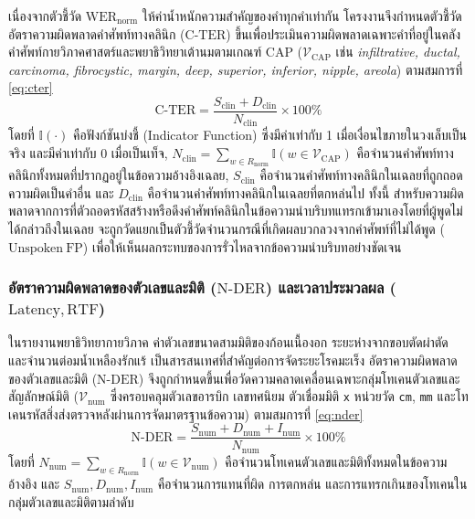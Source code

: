 เนื่องจากตัวชี้วัด $\mathrm{WER}_{\mathrm{norm}}$ ให้ค่าน้ำหนักความสำคัญของคำทุกคำเท่ากัน โครงงานจึงกำหนดตัวชี้วัดอัตราความผิดพลาดคำศัพท์ทางคลินิก ($\mathrm{C\text{-}TER}$) ขึ้นเพื่อประเมินความผิดพลาดเฉพาะคำที่อยู่ในคลังคำศัพท์กายวิภาคศาสตร์และพยาธิวิทยาเต้านมตามเกณฑ์ CAP ($\mathcal{V}_{\mathrm{CAP}}$ เช่น \textit{infiltrative, ductal, carcinoma, fibrocystic, margin, deep, superior, inferior, nipple, areola}) ตามสมการที่ \eqref{eq:cter}
\begin{equation}
\mathrm{C\text{-}TER} = \frac{S_{\mathrm{clin}} + D_{\mathrm{clin}}}{N_{\mathrm{clin}}} \times 100\%
\label{eq:cter}
\end{equation}
โดยที่ $\mathbb{I}(\cdot)$ คือฟังก์ชันบ่งชี้ (Indicator Function) ซึ่งมีค่าเท่ากับ 1 เมื่อเงื่อนไขภายในวงเล็บเป็นจริง และมีค่าเท่ากับ 0 เมื่อเป็นเท็จ, $N_{\mathrm{clin}} = \sum_{w \in R_{\mathrm{norm}}} \mathbb{I}(w \in \mathcal{V}_{\mathrm{CAP}})$ คือจำนวนคำศัพท์ทางคลินิกทั้งหมดที่ปรากฏอยู่ในข้อความอ้างอิงเฉลย, $S_{\mathrm{clin}}$ คือจำนวนคำศัพท์ทางคลินิกในเฉลยที่ถูกถอดความผิดเป็นคำอื่น และ $D_{\mathrm{clin}}$ คือจำนวนคำศัพท์ทางคลินิกในเฉลยที่ตกหล่นไป ทั้งนี้ สำหรับความผิดพลาดจากการที่ตัวถอดรหัสสร้างหรือดึงคำศัพท์คลินิกในข้อความนำบริบทแทรกเข้ามาเองโดยที่ผู้พูดไม่ได้กล่าวถึงในเฉลย จะถูกวัดแยกเป็นตัวชี้วัดจำนวนกรณีที่เกิดผลบวกลวงจากคำศัพท์ที่ไม่ได้พูด ($\mathrm{Unspoken\ FP}$) เพื่อให้เห็นผลกระทบของการรั่วไหลจากข้อความนำบริบทอย่างชัดเจน

\subsubsection{อัตราความผิดพลาดของตัวเลขและมิติ ($\mathrm{N\text{-}DER}$) และเวลาประมวลผล ($\mathrm{Latency}, \mathrm{RTF}$)}

ในรายงานพยาธิวิทยากายวิภาค ค่าตัวเลขขนาดสามมิติของก้อนเนื้องอก ระยะห่างจากขอบตัดผ่าตัด และจำนวนต่อมน้ำเหลืองรักแร้ เป็นสารสนเทศที่สำคัญต่อการจัดระยะโรคมะเร็ง \cite{cap_breast,ajcc2017} อัตราความผิดพลาดของตัวเลขและมิติ ($\mathrm{N\text{-}DER}$) จึงถูกกำหนดขึ้นเพื่อวัดความคลาดเคลื่อนเฉพาะกลุ่มโทเคนตัวเลขและสัญลักษณ์มิติ ($\mathcal{V}_{\mathrm{num}}$ ซึ่งครอบคลุมตัวเลขอารบิก เลขทศนิยม ตัวเชื่อมมิติ \texttt{x} หน่วยวัด \texttt{cm}, \texttt{mm} และโทเคนรหัสสิ่งส่งตรวจหลังผ่านการจัดมาตรฐานข้อความ) ตามสมการที่ \eqref{eq:nder}
\begin{equation}
\mathrm{N\text{-}DER} = \frac{S_{\mathrm{num}} + D_{\mathrm{num}} + I_{\mathrm{num}}}{N_{\mathrm{num}}} \times 100\%
\label{eq:nder}
\end{equation}
โดยที่ $N_{\mathrm{num}} = \sum_{w \in R_{\mathrm{norm}}} \mathbb{I}(w \in \mathcal{V}_{\mathrm{num}})$ คือจำนวนโทเคนตัวเลขและมิติทั้งหมดในข้อความอ้างอิง และ $S_{\mathrm{num}}, D_{\mathrm{num}}, I_{\mathrm{num}}$ คือจำนวนการแทนที่ผิด การตกหล่น และการแทรกเกินของโทเคนในกลุ่มตัวเลขและมิติตามลำดับ

